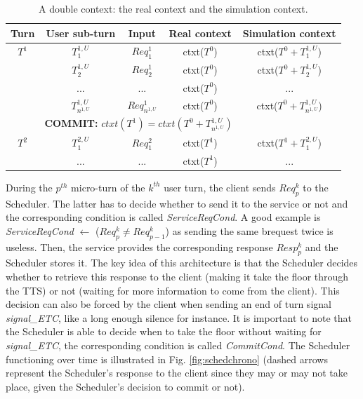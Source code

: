 	\begin{table}[htp]
		\begin{center}
		\begin{tabular}{|c|c|c|c|c|}
			 \hline
			 \textbf{Turn} & \textbf{User sub-turn} & \textbf{Input} & \textbf{Real context} & \textbf{Simulation context} \\
			 \hline
			 $T^1$ & $T^{1,U}_1$ & $Req^1_1$ & ctxt($T^0$) & ctxt($T^0 + T^{1,U}_1$) \\
						 & $T^{1,U}_2$ & $Req^1_2$ & ctxt($T^0$) & ctxt($T^0 + T^{1,U}_2$) \\
						 &    ...     &     ...     & ctxt($T^0$) & ... \\
						 & $T^{1,U}_{n^{1,U}}$ & $Req^1_{n^{1,U}}$ & ctxt($T^0$) & ctxt($T^0 + T^{1,U}_{n^{1,U}}$) \\
			 \hline
						 & \multicolumn{3}{c}{\multirow{2}{*}{\textbf{COMMIT:} $ ctxt(T^1) = ctxt(T^0 + T^{1,U}_{n^{1,U}}) $}} & \\
						 & \multicolumn{3}{c}{} & \\
			 \hline
			 $T^2$ & $T^{2,U}_1$ & $Req^2_1$ & ctxt($T^1$) & ctxt($T^1 + T^{2,U}_1$) \\
						 &    ...     &     ...     & ctxt($T^1$) & ... \\
			 \hline
		\end{tabular}
	        \end{center}
	        \caption{A double context: the real context and the simulation context.}
	        \label{tab:contextchrono}
        \end{table}
    
    	During the $p^{th}$ micro-turn of the $k^{th}$ user turn, the client sends $Req^k_p$ to the Scheduler. The latter has to decide whether to send it to the service or not and the corresponding condition is called \textit{ServiceReqCond}. A good example is \textit{ServiceReqCond} $\leftarrow$ ($Req^k_p \neq Req^k_{p-1}$) as sending the same brequest twice is useless. Then, the service provides the corresponding response $Resp^k_p$ and the Scheduler stores it. The key idea of this architecture is that the Scheduler decides whether to retrieve this response to the client (making it take the floor through the TTS) or not (waiting for more information to come from the client). This decision can also be forced by the client when sending an end of turn signal \textit{signal\_ETC}, like a long enough silence for instance. It is important to note that the Scheduler is able to decide when to take the floor without waiting for \textit{signal\_ETC}, the corresponding condition is called \textit{CommitCond}. The Scheduler functioning over time is illustrated in Fig. \ref{fig:schedchrono} (dashed arrows represent the Scheduler's response to the client since they may or may not take place, given the Scheduler's decision to commit or not).
                
